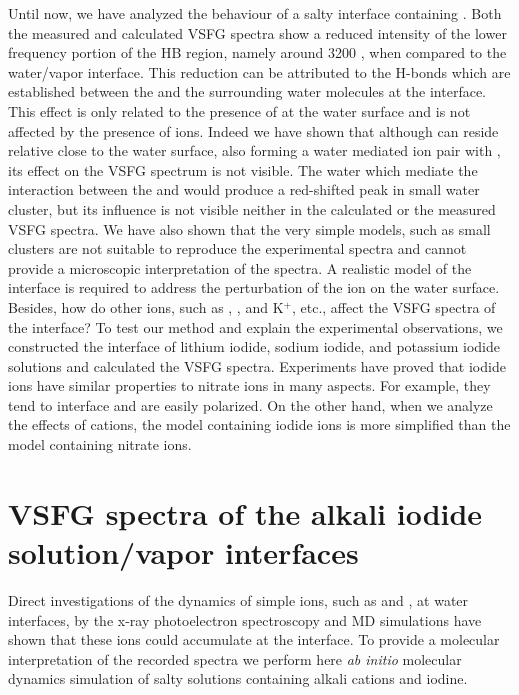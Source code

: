 Until now, we have analyzed the behaviour of a salty interface containing \LiN.
Both the measured and calculated VSFG spectra show a reduced intensity of the lower frequency portion of
the HB region, namely around 3200 \centimeter, when compared to the water/vapor interface. 
This reduction can be attributed to the H-bonds which are established between the \nitrate and the surrounding water molecules at the interface.
This effect is only related to the presence of \nitrate at the water surface and is not affected by the presence of \Li ions.
Indeed we have shown that although \Li can reside relative close to the water surface, also forming a water mediated
ion pair with \nit, its effect on the VSFG spectrum is not visible. The water which mediate the interaction 
between the \nitrate and \Li would produce a red-shifted peak in small water cluster, but its influence is not visible 
neither in the calculated or the measured VSFG spectra. We have also shown that the very simple models,
such as small clusters are not suitable to reproduce the experimental spectra and cannot provide a microscopic interpretation of the spectra. 
A realistic model of the interface is required to address the perturbation of the ion on the water surface.
Besides, how do other ions, such as \li, \na, and K$^+$, etc., affect the VSFG spectra of the interface? 
To test our method and explain the experimental observations, we constructed the interface of lithium iodide,
 sodium iodide, and potassium iodide solutions and calculated the VSFG spectra. 
Experiments have proved that iodide ions have similar properties to nitrate ions in many aspects. 
For example, they tend to interface and are easily polarized. 
On the other hand, when we analyze the effects of cations, the model containing iodide ions is more simplified than the model containing nitrate ions.

\section{VSFG spectra of the alkali iodide solution/vapor interfaces}\label{sfg_alkali_iodide_interface} %
Direct investigations of the dynamics of simple ions, such as \I and \br, at water interfaces, 
by the x-ray photoelectron spectroscopy \cite{ghosal2005} and MD simulations \cite{PJ01,PJ02} 
have shown that these ions could accumulate at the interface.
To provide a molecular interpretation of the recorded spectra we perform here \emph{ab initio} molecular dynamics simulation of salty solutions containing alkali cations
and iodine. %

